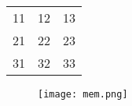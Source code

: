 \documentclass{article}
\begin{document}
\begin{center}
\begin{tabular}{ c c c }
11 & 12 & 13 \\
21 & 22 & 23 \\
31 & 32 & 33
\end{tabular}
\end{center}
\begin{figure}[ht]
\centering
\texttt{[image: mem.png]}
\end{figure}
\end{document}
